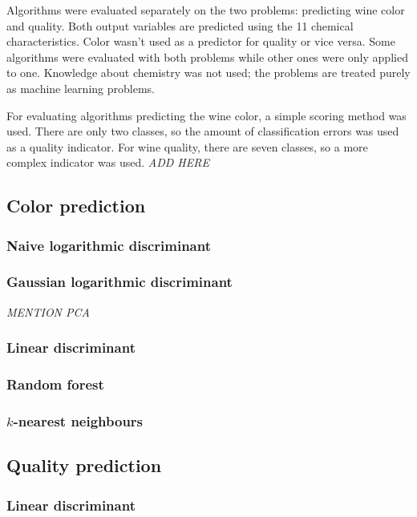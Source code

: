 \documentclass[twoside]{article}
\begin{document}
\begin{multicols}{2}
Algorithms were evaluated separately on the two problems: predicting wine color and quality.
Both output variables are predicted using the 11 chemical characteristics. Color wasn't used
as a predictor for quality or vice versa.
Some algorithms were evaluated with both problems while other ones were only applied to one.
Knowledge about chemistry was not used; the problems are treated purely as machine learning
problems.

For evaluating algorithms predicting the wine color, a simple scoring method was used.
There are only two classes, so the amount of classification errors was used as a quality indicator.
For wine quality, there are seven classes, so a more complex indicator was used. \emph{ADD HERE}

\subsection{Color prediction}

\subsubsection{Naive logarithmic discriminant}

\subsubsection{Gaussian logarithmic discriminant}

\emph{MENTION PCA}

\subsubsection{Linear discriminant}

\subsubsection{Random forest}

\subsubsection{$k$-nearest neighbours}

\subsection{Quality prediction}

\subsubsection{Linear discriminant}


\end{multicols}
\end{document}

